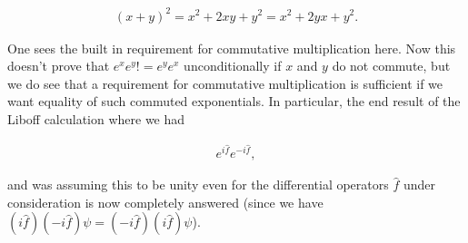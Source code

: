 \begin{align}\label{eqn:exponentialCommutation:8}
(x + y)^2 = x^2 + 2 x y + y^2 = x^2 + 2 y x + y^2.
\end{align}

One sees the built in requirement for commutative multiplication here.  Now this doesn't prove that $e^{x} e^{y} != e^{y} e^{x}$ unconditionally if $x$ and $y$ do not commute, but we do see that a requirement for commutative multiplication is sufficient if we want equality of such commuted exponentials.  In particular, the end result of the Liboff calculation where we had

\begin{align}\label{eqn:exponentialCommutation:9}
e^{i \hat{f}} e^{-i \hat{f}},
\end{align}

and was assuming this to be unity even for the differential operators $\hat{f}$ under consideration is now completely answered (since we have $(i \hat{f}) (-i \hat{f}) \psi = (-i \hat{f}) (i \hat{f}) \psi$).

\EndNoBibArticle

